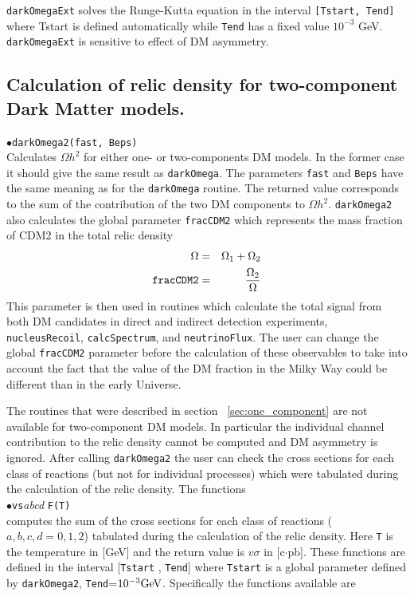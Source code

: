 \documentclass[12pt,a4paper]{article}
\begin{document}
 {\tt darkOmegaExt} solves  the Runge-Kutta equation in the interval {\tt [Tstart, Tend]} 
 where Tstart is defined automatically while {\tt Tend} has a fixed
value $10^{-3}$ GeV.  {\tt darkOmegaExt} is sensitive to effect of DM
asymmetry.
 

\subsection{Calculation of relic density for  two-component Dark Matter models.}


$\bullet$\verb|darkOmega2(fast, Beps)|\\
Calculates $\Omega h^2$ for either  one- or  two-components DM models. In the former case it should give the same result as \verb|darkOmega|.
The parameters {\tt fast} and {\tt Beps} have the same meaning as for the {\tt darkOmega} routine.
The returned value corresponds to the sum of the contribution of the two  DM components to  $\Omega h^2$.  
 \verb|darkOmega2| also calculates the  global parameter {\tt fracCDM2} which represents the mass fraction of CDM2 
in the total relic density
\begin{eqnarray}
  \Omega &=& \Omega_1+\Omega_2\\
  \verb|fracCDM2|&=&\frac{\Omega_2}{\Omega}
\end{eqnarray}
This parameter is then used in routines which calculate the total signal from both  DM candidates in direct and indirect detection experiments,
 \verb|nucleusRecoil|, \verb|calcSpectrum|,  and \verb|neutrinoFlux|.  The user can change the global {\tt  fracCDM2} parameter before the calculation of these observables
to take into account the fact that the value of the DM fraction in the Milky Way could be different than   in the early Universe.

The routines that were described in section ~\ref{sec:one_component} are not available for two-component DM models. In particular the individual channel contribution to the relic density cannot be computed and DM asymmetry is ignored. 
 After calling  {\tt  darkOmega2}  the user can check the  cross sections  
for each class of reactions (but not for individual processes) which were tabulated during the calculation of the relic density. 
The functions\\
$\bullet$\verb|vs|{\it abcd} \verb|F(T)|\\
computes the sum of  the cross sections  
for each class of reactions ($a,b,c,d=0,1,2$) tabulated during the calculation of the relic density. 
Here  \verb|T| is the temperature in [GeV] and the 
return value is $v\sigma$ in [c$\cdot$pb].  These functions are defined in the interval [{\tt Tstart} , {\tt Tend}] where
{\tt Tstart} is a global parameter defined by \verb|darkOmega2|, {\tt Tend}=$10^{-3}{\rm GeV}$. Specifically the functions available are
\end{document}
